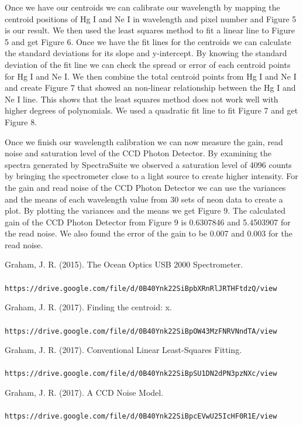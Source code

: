 \documentclass[onecolumn, 12pt, a4paper]{article}
\begin{document}
Once we have our centroids we can calibrate our wavelength by mapping the centroid positions of Hg I and Ne I in wavelength and pixel number and Figure 5 is our result. We then used the least squares method to fit a linear line to Figure 5 and get Figure 6. Once we have the fit lines for the centroids we can calculate the standard deviations for its slope and y-intercept. By knowing the standard deviation of the fit line we can check the spread or error of each centroid points for Hg I and Ne I. We then combine the total centroid points from Hg I and Ne I and create Figure 7 that showed an non-linear relationship between the Hg I and Ne I line. This shows that the least squares method does not work well with higher degrees of polynomials. We used a quadratic fit line to fit Figure 7 and get Figure 8.

Once we finish our wavelength calibration we can now measure the gain, read noise and saturation level of the CCD Photon Detector. By examining the spectra generated by SpectraSuite we observed a saturation level of 4096 counts by bringing the spectrometer close to a light source to create higher intensity. For the gain and read noise of the CCD Photon Detector we can use the variances and the means of each wavelength value from 30 sets of neon data to create a plot. By plotting the variances and the means we get Figure 9. The calculated gain of the CCD Photon Detector from Figure 9 is 0.6307846 and 5.4503907 for the read noise. We also found the error of the gain to be 0.007 and 0.003 for the read noise.

\begin{thebibliography}{9}

 Graham, J. R. (2015). The Ocean Optics USB 2000 Spectrometer.\\

\\\texttt{https://drive.google.com/file/d/0B40Ynk22SiBpbXRnRlJRTHFtdzQ/view}

 Graham, J. R. (2017). Finding the centroid: \big \langle x\big \rangle.\\

\\\texttt{https://drive.google.com/file/d/0B40Ynk22SiBpOW43MzFNRVNndTA/view}

 Graham, J. R. (2017). Conventional Linear Least-Squares Fitting.\\

\\\texttt{https://drive.google.com/file/d/0B40Ynk22SiBpSU1DN2dPN3pzNXc/view}

 Graham, J. R. (2017). A CCD Noise Model.\\

\\\texttt{https://drive.google.com/file/d/0B40Ynk22SiBpcEVwU25IcHF0R1E/view}
\end{thebibliography}
\end{document}
